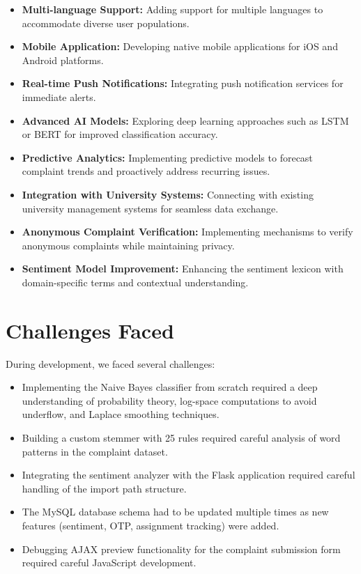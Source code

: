 \documentclass[12pt,a4paper]{report}
\begin{document}
\begin{itemize}[nolistsep]
    \item \textbf{Multi-language Support:} Adding support for multiple languages to accommodate diverse user populations.
    \item \textbf{Mobile Application:} Developing native mobile applications for iOS and Android platforms.
    \item \textbf{Real-time Push Notifications:} Integrating push notification services for immediate alerts.
    \item \textbf{Advanced AI Models:} Exploring deep learning approaches such as LSTM or BERT for improved classification accuracy.
    \item \textbf{Predictive Analytics:} Implementing predictive models to forecast complaint trends and proactively address recurring issues.
    \item \textbf{Integration with University Systems:} Connecting with existing university management systems for seamless data exchange.
    \item \textbf{Anonymous Complaint Verification:} Implementing mechanisms to verify anonymous complaints while maintaining privacy.
    \item \textbf{Sentiment Model Improvement:} Enhancing the sentiment lexicon with domain-specific terms and contextual understanding.
\end{itemize}

\section{Challenges Faced}
During development, we faced several challenges:

\begin{itemize}[nolistsep]
    \item Implementing the Naive Bayes classifier from scratch required a deep understanding of probability theory, log-space computations to avoid underflow, and Laplace smoothing techniques.
    \item Building a custom stemmer with 25 rules required careful analysis of word patterns in the complaint dataset.
    \item Integrating the sentiment analyzer with the Flask application required careful handling of the import path structure.
    \item The MySQL database schema had to be updated multiple times as new features (sentiment, OTP, assignment tracking) were added.
    \item Debugging AJAX preview functionality for the complaint submission form required careful JavaScript development.
\end{itemize}
\end{document}
